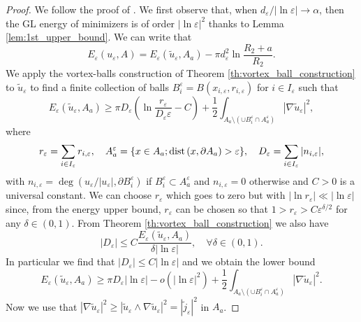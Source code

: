 \documentclass[12pt,reqno]{amsart}
\def\e {{\varepsilon}}
\def\dist{{\rm dist\,}}
\def \p {\partial}
\numberwithin{equation}{section}
\begin{document}
\begin{proof} We follow the proof of \cite[Theorem 7.1, Item 1)]{Sandier_Serfaty_2007}. We first observe that, when \(d_\e/|\ln \e| \to \alpha\), then the GL energy of minimizers is of order \(|\ln \e|^2\) thanks to Lemma \ref{lem:1st_upper_bound}.  We can write that
\begin{equation}\label{eq:sum_energy}
E_\e(u_\e,A)=E_\e(\tilde{u}_\e, A_a)-\pi d_\e^2 \ln \frac{R_2+a}{R_2}.
\end{equation}
We apply the vortex-balls construction of Theorem \ref{th:vortex_ball_construction} to \(\tilde{u}_\e\) to find a finite collection of balls \(B_i^\e=B(x_{i,\e},r_{i,\e})\) for \(i \in I_\e\) such that
\begin{equation*}
E_\e(\tilde{u}_\e,A_a)\geq \pi D_\e\left( \ln \frac{r_\e}{D_\e \e}-C \right)+\frac12 \int_{A_a \setminus \left( \cup B_i^\e \cap A_a^\e \right)} |\nabla \tilde{u}_\e|^2,
\end{equation*}
where 
\[r_\e=\sum_{i\in I_\e} r_{i,\e}, \quad A_a^\e=\{x\in A_a; \dist (x,\p A_a)>\e\},  \quad D_\e=\sum_{i\in I_\e} |n_{i,\e}|,\] with \(n_{i,\e}=\deg (u_\e/|u_\e|,\p B_i^\e)\) if \(B_i^\e\subset A_a^\e\) and \(n_{i,\e}=0\) otherwise  and \(C>0\) is a universal constant. We can choose \(r_\e\) which goes to zero but with \(|\ln r_\e| \ll |\ln \e|\) since, from the energy upper bound, \(r_\e\) can be chosen so that \(1>r_\e>C\e^{\delta/2}\) for any \(\delta \in (0,1)\). From Theorem \ref{th:vortex_ball_construction} we also have
\begin{equation}\label{eq:bound_number_vortices}
|D_\e| \leq C \frac{E_\e(\tilde{u}_\e,A_a)}{\delta|\ln \e|}, \quad \forall \delta \in (0,1).
\end{equation}
In particular we find that \( |D_\e|\leq C|\ln \e|\) and we obtain the lower bound
\begin{equation}\label{eq:lower_bound_1}
E_\e(\tilde{u}_\e,A_a)\geq \pi D_\e |\ln \e| -o(|\ln \e|^2)+\frac12 \int_{A_a\setminus \left( \cup B_i^\e \cap A_a^\e \right)} |\nabla \tilde{u}_\e|^2.
\end{equation}
Now we use that \(|\nabla \tilde{u}_\e|^2\geq |\tilde{u}_\e\wedge \nabla \tilde{u}_\e|^2=|\tilde{j}_\e|^2\) in \(A_a\).


\end{proof}
\end{document}
